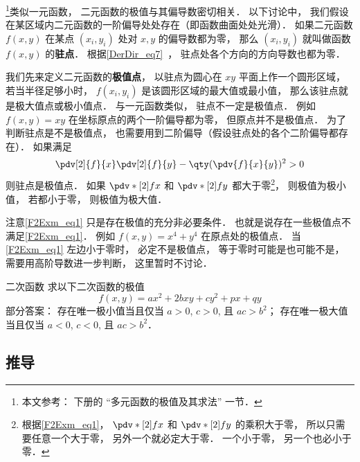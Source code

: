 

\footnote{本文参考： \cite{同济高} 下册的 “多元函数的极值及其求法” 一节．}类似一元函数， 二元函数的极值与其偏导数密切相关． 以下讨论中， 我们假设在某区域内二元函数的一阶偏导处处存在（即函数曲面处处光滑）． 如果二元函数 $f(x,y)$ 在某点 $(x_i, y_i)$ 处对 $x, y$ 的偏导数都为零， 那么 $(x_i, y_i)$ 就叫做函数 $f(x,y)$ 的\textbf{驻点}． 根据\autoref{DerDir_eq7}~， 驻点处各个方向的方向导数也都为零．

我们先来定义二元函数的\textbf{极值点}， 以驻点为圆心在 $xy$ 平面上作一个圆形区域， 若当半径足够小时， $f(x_i, y_i)$ 是该圆形区域的最大值或最小值， 那么该驻点就是极大值点或极小值点． 与一元函数类似， 驻点不一定是极值点． 例如 $f(x,y) = xy$ 在坐标原点的两个一阶偏导都为零， 但原点并不是极值点． 为了判断驻点是不是极值点， 也需要用到二阶偏导（假设驻点处的各个二阶偏导都存在）． 如果满足
\begin{equation}\label{F2Exm_eq1}
\pdv[2]{f}{x}\pdv[2]{f}{y} - \qty(\pdv{f}{x}{y})^2 > 0
\end{equation}
则驻点是极值点． 如果 $\pdv*[2]{f}{x}$ 和 $\pdv*[2]{f}{y}$ 都大于零\footnote{根据\autoref{F2Exm_eq1}， $\pdv*[2]{f}{x}$ 和 $\pdv*[2]{f}{y}$ 的乘积大于零， 所以只需要任意一个大于零， 另外一个就必定大于零． 一个小于零， 另一个也必小于零．}， 则极值为极小值， 若都小于零， 则极值为极大值．

注意\autoref{F2Exm_eq1} 只是存在极值的充分非必要条件． 也就是说存在一些极值点不满足\autoref{F2Exm_eq1}． 例如 $f(x, y) = x^4 + y^4$ 在原点处的极值点． 当\autoref{F2Exm_eq1} 左边小于零时， 必定不是极值点， 等于零时可能是也可能不是， 需要用高阶导数进一步判断， 这里暂时不讨论．

\begin{exercise}{二次函数}
求以下二次函数的极值
\begin{equation}
f(x, y) = ax^2 + 2bxy + cy^2 + px + qy
\end{equation}
部分答案： 存在唯一极小值当且仅当 $a>0$, $c>0$, 且 $ac>b^2$； 存在唯一极大值当且仅当 $a<0$, $c<0$, 且 $ac>b^2$．
\end{exercise}

\subsection{推导}

